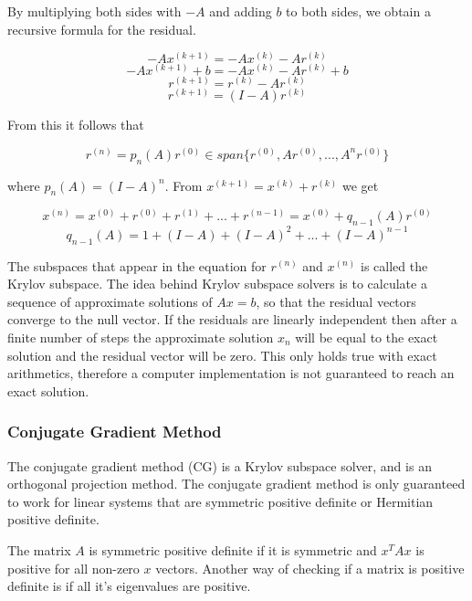 By multiplying both sides with $-A$ and adding $b$ to both sides, we obtain a 
recursive formula for the residual.

$$ -Ax^{(k+1)} = -Ax^{(k)} - Ar^{(k)} $$
$$ -Ax^{(k+1)} + b = -Ax^{(k)} - Ar^{(k)} + b $$
$$ r^{(k+1)} = r^{(k)} - Ar^{(k)} $$
$$ r^{(k+1)} = (I - A)r^{(k)} $$

From this it follows that 

$$ r^{(n)} = p_n(A)r^{(0)} \in span \{r^{(0)}, Ar^{(0)}, ..., A^{n}r^{(0)}\} $$

where $p_n(A) = (I - A)^n$. From $ x^{(k+1)} = x^{(k)} + r^{(k)} $ we get 

$$ x^{(n)} = x^{(0)} + r^{(0)} + r^{(1)} + ... + r^{(n-1)} = x^{(0)} + q_{n-1}(A)r^{(0)} $$
$$ q_{n-1}(A) = 1 + (I-A) + (I-A)^2 + ... + (I-A)^{n-1} $$

The subspaces that appear in the equation for $r^{(n)}$ and $x^{(n)}$ is called the 
Krylov subspace. The idea behind Krylov subspace solvers is to calculate a sequence 
of approximate solutions of $Ax = b$, so that the residual vectors converge to the 
null vector. If the residuals are linearly independent then 
after a finite number of steps the approximate solution $x_n$ will be equal to the 
exact solution and the residual vector will be zero. This only holds true with exact 
arithmetics, therefore a computer implementation is not guaranteed to reach an exact 
solution\cite{krylovSolvers}.

\subsubsection{Conjugate Gradient Method}

The conjugate gradient method (CG) is a Krylov subspace solver, and is an orthogonal 
projection method. The conjugate gradient method is only guaranteed to work for 
linear systems that are symmetric positive definite or Hermitian positive definite.

The matrix $A$ is symmetric positive definite if it is symmetric and $x^T A x$ is 
positive for all non-zero $x$ vectors. Another way of checking if a matrix is 
positive definite is if all it's eigenvalues are positive. 


